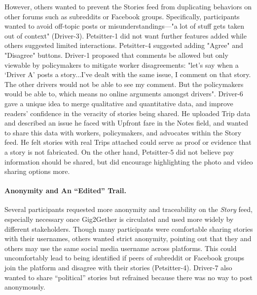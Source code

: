 However, others wanted to prevent the Stories feed from duplicating behaviors on other forums such as subreddits or Facebook groups. Specifically, participants wanted to avoid off-topic posts or misunderstandings---"a lot of stuff gets taken out of context" (Driver-3). Petsitter-1 did not want further features added while others suggested limited interactions. Petsitter-4 suggested adding "Agree" and "Disagree" buttons. Driver-1 proposed that comments be allowed but only viewable by policymakers to mitigate worker disagreements: "let's say when a `Driver A' posts a story...I've dealt with the same issue, I comment on that story. The other drivers would not be able to see my comment. But the policymakers would be able to, which means no online arguments amongst drivers".
%
Driver-6 gave a unique idea to merge qualitative and quantitative data, {and improve readers' confidence} in the veracity of stories being shared. He uploaded Trip data and described an issue he faced with Upfront fare in the Notes field, and wanted to share this data with workers, policymakers, and advocates within the Story feed. He felt stories with real Trips attached could serve as proof or evidence that a story is not fabricated. On the other hand, Petsitter-5 did not believe pay information should be shared, but did encourage highlighting the photo and video sharing options more.

\paragraph{\textbf{Anonymity and An ``Edited'' Trail.}} 

Several participants requested more anonymity and traceability on the \textit{Story} feed, especially necessary once Gig2Gether is circulated and used more widely by different stakeholders. Though many participants were comfortable sharing stories with their usernames, others wanted strict anonymity, pointing out that they and others may use the same social media username across platforms. This could uncomfortably lead to being identified if peers of subreddit or Facebook groups join the platform and disagree with their stories (Petsitter-4). Driver-7 also wanted to share ``political'' stories but refrained because there was no way to post anonymously.

